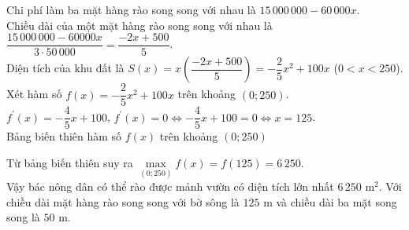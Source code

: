 \begin{bt}
{		Chi phí làm ba mặt  hàng rào song song với nhau là $15\,000\,000-60\,000x$.\\
		Chiều dài của một mặt hàng  rào song song với nhau là $\dfrac{15\,000\,000-60000x}{3\cdot 50\,000}=\dfrac{-2x+500}{5}$.\\
		Diện tích của khu đất là $S(x)=x\left(  \dfrac{-2x+500}{5}\right)=-\dfrac{2}{5}x^2+100x$ ($0<x<250$).\\
		Xét hàm số $f(x)= -\dfrac{2}{5}x^2+100x$ trên khoảng  $(0;250)$.\\
		$f^\prime (x)=-\dfrac{4}{5}x+100$,  $f^\prime (x)=0\Leftrightarrow -\dfrac{4}{5}x+100=0\Leftrightarrow x=125$.\\
		Bảng biến thiên hàm  số $f(x)$ trên khoảng $(0;250)$
		\begin{center}
		\end{center}
		Từ bảng biến  thiên suy ra $\max\limits_{(0;250)} f(x)=f(125)=6\,250$.\\
		Vậy bác nông dân có thể rào được mảnh vườn có diện tích lớn nhất $6\,250 \text{ m}^2$. Với chiều dài mặt hàng rào song song với bờ sông là $125 \text{ m}$  và chiều dài ba mặt song song là $50 \text{ m}$.
	 }
\end{bt}

